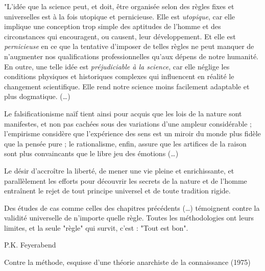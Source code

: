 \ChapterStar{}
\thispagestyle{preface}
\vspace{120pt}
\begin{tirade}
"L’idée que la science peut, et doit, être organisée selon des règles fixes et
universelles est à la fois utopique et pernicieuse. Elle est \emph{utopique},
car elle implique une conception trop simple des aptitudes de l’homme et des
circonstances qui encouragent, ou causent, leur développement. Et elle est
\emph{pernicieuse} en ce que la tentative d’imposer de telles règles ne peut
manquer de n’augmenter nos qualifications professionnelles qu’aux dépens de notre
humanité.
En outre, une telle idée est \emph{préjudiciable à la science}, car elle néglige
les conditions physiques et historiques complexes qui influencent en réalité le
changement scientifique. Elle rend notre science moins facilement adaptable et
plus dogmatique. (\ldots)

Le falsificationisme naïf tient ainsi pour acquis que les lois de la nature
sont manifestes, et non pas cachées sous des variations d’une ampleur
considérable ; l’empirisme considère que l’expérience des sens est un miroir du
monde plus fidèle que la pensée pure ; le rationalisme, enfin, assure que les
artifices de la raison sont plus convaincants que le libre jeu des émotions
(\ldots)

Le désir d’accroître la liberté, de mener une vie pleine et enrichissante, et
parallèlement les efforts pour découvrir les secrets de la nature et de l’homme
entraînent le rejet de tout principe universel et de toute tradition rigide.


Des études de cas comme celles des chapitres précédents (\ldots)
témoignent contre la validité universelle de n'importe quelle règle. Toutes les
méthodologies ont leurs limites, et la seule "règle" qui survit, c'est : "Tout
est bon".
\end{tirade}
\hfill P.K. Feyerabend

\hfill\footnotesize  Contre la méthode, esquisse d’une théorie anarchiste de la
 connaissance (1975)
 \normalsize
